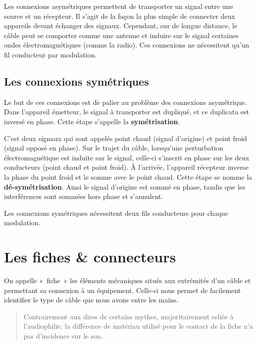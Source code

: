 \documentclass[
]{book}
\begin{document}
Les connexions asymétriques permettent de transporter un signal entre une source et un récepteur. Il s'agit de la façon la plus simple de connecter deux appareils devant échanger des signaux. Cependant, sur de longue distance, le câble peut se comporter comme une antenne et induire sur le signal certaines ondes électromagnétiques (comme la radio). Ces connexions ne nécessitent qu'un fil conducteur par modulation.

\hypertarget{les-connexions-symuxe9triques}{%
\subsection{Les connexions symétriques}\label{les-connexions-symuxe9triques}}

Le but de ces connexions est de palier au problème des connexions asymétrique. Dans l'appareil émetteur, le signal à transporter est dupliqué, et ce duplicata est inversé en phase. Cette étape s'appelle la \textbf{symétrisation}.

C'est deux signaux qui sont appelés point chaud (signal d'origine) et point froid (signal opposé en phase). Sur le trajet du câble, lorsqu'une perturbation électromagnétique est induite sur le signal, celle-ci s'inscrit en phase sur les deux conducteurs (point chaud et point froid). À l'arrivée, l'appareil récepteur inverse la phase du point froid et le somme avec le point chaud. Cette étape se nomme la \textbf{dé-symétrisation}. Ainsi le signal d'origine est sommé en phase, tandis que les interférences sont sommées hors phase et s'annulent.

Les connexions symétriques nécessitent deux fils conducteurs pour chaque modulation.

\hypertarget{les-fiches-connecteurs}{%
\section{Les fiches \& connecteurs}\label{les-fiches-connecteurs}}

On appelle «~fiche~» les éléments mécaniques situés aux extrémités d'un câble et permettant sa connexion à un équipement. Celle-ci nous permet de facilement identifier le type de câble que nous avons entre les mains.

\begin{quote}
Contrairement aux dires de certains mythes, majoritairement reliée à l'audiophilie, la différence de matériau utilisé pour le contact de la fiche n'a pas d'incidence sur le son.
\end{quote}
\end{document}
